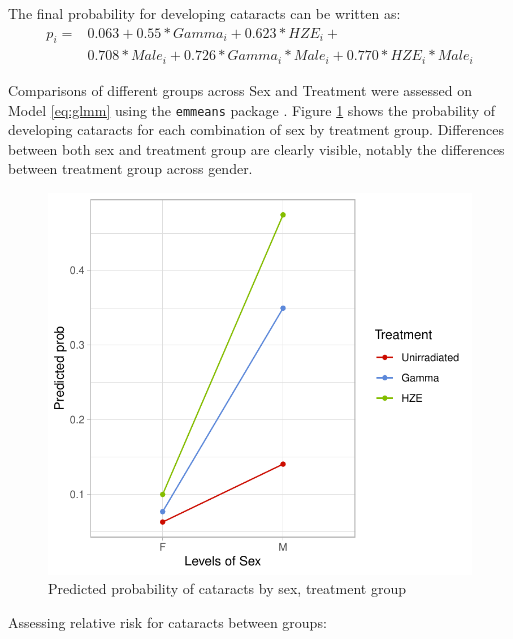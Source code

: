 \documentclass[12pt]{article}
\begin{document}
The final probability for developing cataracts can be written as:\\
\begin{equation}
\begin{aligned}
p_i = &0.063 + 0.55*Gamma_i + 0.623*HZE_i + \\
&0.708*Male_i + 0.726*Gamma_i*Male_i + 0.770*HZE_i*Male_i
\end{aligned}
\label{eq:probs}
\end{equation}

Comparisons of different groups across Sex and Treatment were assessed on Model \eqref{eq:glmm} using the \texttt{emmeans} package \citep{R-emmeans}. Figure \ref{fig:contr} shows the probability of developing cataracts for each combination of sex by treatment group. Differences between both sex and treatment group are clearly visible, notably the differences between treatment group across gender.

\begin{figure}[H]

{\centering \includegraphics{bookdown_report_files/figure-latex/contr-1} 

}

\caption{Predicted probability of cataracts by sex, treatment group}\label{fig:contr}
\end{figure}

Assessing relative risk for cataracts between groups:\\
\end{document}
